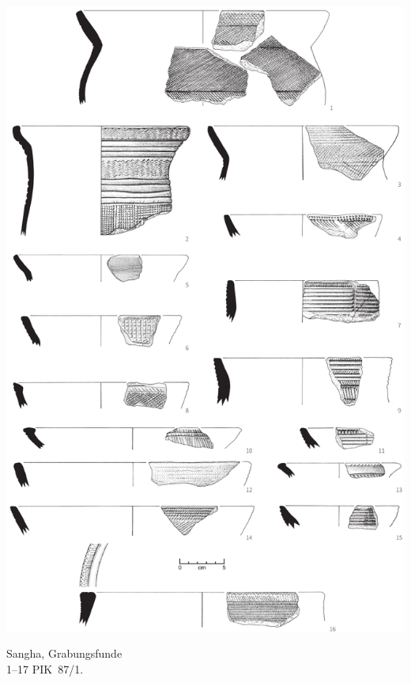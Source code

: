 \begin{pl}[H]
	\includegraphics{plt/Taf45.pdf}
	\vspace{.75em}\caption{\mbox{Sangha}, Grabungsfunde \\ 1--17 PIK~87/1.}
	\label{pl:45}
\end{pl}

